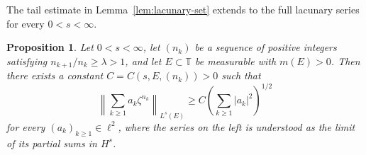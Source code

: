 \documentclass[11pt, reqno]{amsart}
\newtheorem{proposition}[theorem]{Proposition}
\theoremstyle{definition}
\theoremstyle{remark}
\newcommand{\T}{\mathbb{T}}
\begin{document}
The tail estimate in Lemma~\ref{lem:lacunary-set} extends to
the full lacunary series for every \(0<s<\infty\).

\begin{proposition}
\label{prop:lacunary-local}
Let \(0<s<\infty\), let \((n_k)\) be a sequence of positive integers
satisfying \(n_{k+1}/n_k\ge\lambda>1\), and let \(E\subset\T\) be
measurable with \(m(E)>0\). Then there exists a constant
\(C=C(s,E,(n_k))>0\) such that
\begin{equation}
\label{eq:local-full}
        \left\|
        \sum_{k\ge1}a_k\zeta^{n_k}
        \right\|_{L^s(E)}
        \ge
        C\left(\sum_{k\ge1}|a_k|^2\right)^{1/2}
\end{equation}
for every \((a_k)_{k\ge1}\in\ell^2\), where the series on the left is
understood as the limit of its partial sums in \(H^s\).
\end{proposition}
\end{document}

